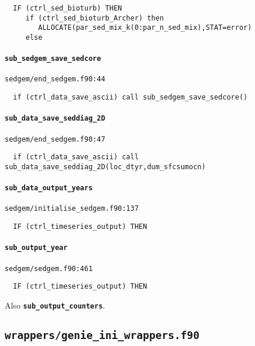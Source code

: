 \documentclass[a4paper,10pt,article]{memoir}
\begin{document}
\begin{verbatim}
  IF (ctrl_sed_bioturb) THEN
     if (ctrl_sed_bioturb_Archer) then
        ALLOCATE(par_sed_mix_k(0:par_n_sed_mix),STAT=error)
     else
\end{verbatim}

\paragraph{\texttt{sub\_sedgem\_save\_sedcore}}

\texttt{sedgem/end\_sedgem.f90:44}

\begin{verbatim}
  if (ctrl_data_save_ascii) call sub_sedgem_save_sedcore()
\end{verbatim}

\paragraph{\texttt{sub\_data\_save\_seddiag\_2D}}

\texttt{sedgem/end\_sedgem.f90:47}

\begin{verbatim}
  if (ctrl_data_save_ascii) call sub_data_save_seddiag_2D(loc_dtyr,dum_sfcsumocn)
\end{verbatim}

\paragraph{\texttt{sub\_data\_output\_years}}

\texttt{sedgem/initialise\_sedgem.f90:137}

\begin{verbatim}
  IF (ctrl_timeseries_output) THEN
\end{verbatim}

\paragraph{\texttt{sub\_output\_year}}

\texttt{sedgem/sedgem.f90:461}

\begin{verbatim}
  IF (ctrl_timeseries_output) THEN
\end{verbatim}

Also \textbf{\texttt{sub\_output\_counters}}.


\subsection*{\texttt{wrappers/genie\_ini\_wrappers.f90}}
\end{document}

